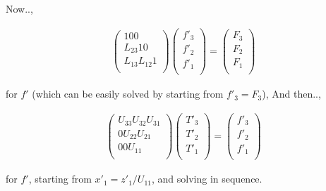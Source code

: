 Now..,

\begin{eqnarray}
  \left( \begin{array}{lll}
         1       0       0      \\
         L_{23}  1       0      \\
         L_{13}  L_{12}  1      \\
         \end{array} \right)
  \left( \begin{array}{l}
         f'_3 \\ f'_2 \\ f'_1 \\
         \end{array} \right)
  = 
  \left(  \begin{array}{l}
          F_3 \\ F_2 \\ F_1 \\
          \end{array} \right)
\end{eqnarray}

\begin{quote}
\protect\hypertarget{solve-z}{}{\blazer[solve-z]}
\end{quote}

for \(f'\) (which can be easily solved by starting from \(f'_3=F_3\)),
And then..,

\begin{eqnarray}
  \left( \begin{array}{lll}
         U_{33}  U_{32}  U_{31} \\
         0       U_{22}  U_{21} \\
         0       0       U_{11} \\
         \end{array} \right)
  \left( \begin{array}{l}
         T'_3 \\ T'_2 \\ T'_1 \\
         \end{array} \right)
  = 
  \left(  \begin{array}{l}
          f'_3 \\ f'_2 \\ f'_1 \\
          \end{array} \right)
\end{eqnarray}

for \(f'\), starting from \(x'_1=z'_1/U_{11}\), and solving in sequence.

